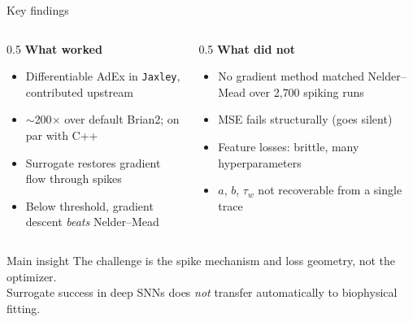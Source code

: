 \documentclass[17pt, t, lualatex]{beamer}
\newcommand{\good}[1]{{\color{dark green}#1}}
\newcommand{\bad}[1]{{\color{dark brick}#1}}
\newcommand{\cmark}{{\color{dark green}\ding{51}}}
\newcommand{\xmark}{{\color{dark brick}\ding{55}}}
\begin{document}
\begin{frame}{Key findings}
\small
\begin{columns}[T]
\begin{column}{0.5\textwidth}
\textbf{\good{What worked}}
\begin{itemize}
  \item[\cmark] Differentiable AdEx in \texttt{Jaxley}, contributed upstream
  \item[\cmark] $\sim$200$\times$ over default Brian2; on par with C++
  \item[\cmark] Surrogate restores gradient flow through spikes
  \item[\cmark] Below threshold, gradient descent \emph{beats} Nelder--Mead
\end{itemize}
\end{column}
\begin{column}{0.5\textwidth}
\textbf{\bad{What did not}}
\begin{itemize}
  \item[\xmark] No gradient method matched Nelder--Mead over 2{,}700 spiking runs
  \item[\xmark] MSE fails structurally (goes silent)
  \item[\xmark] Feature losses: brittle, many hyperparameters
  \item[\xmark] $a$, $b$, $\tau_w$ not recoverable from a single trace
\end{itemize}
\end{column}
\end{columns}
\vspace{0.2cm}
\begin{block}{Main insight}
\centering
The challenge is the \alert{spike mechanism and loss geometry}, not the optimizer.\\ Surrogate success in deep SNNs does \emph{not} transfer automatically to biophysical fitting.
\end{block}
\end{frame}
\end{document}
